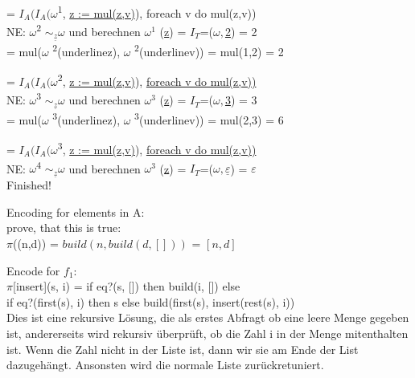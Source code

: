 \documentclass[10pt, a4paper]{article}
\newcommand{\letpi}{$\pi$}
\newcommand{\InterA}{$I_{\mathcal{A}}$}
\newcommand{\InterP}{$I_{\mathcal{P}}$}
\newcommand{\InterT}{$I_{\mathcal{T}}$}
\newcommand{\unl}[1]{\underline{#1}}
\begin{document}
    
    = $I_A(I_A(\omega$\textsuperscript{1}, \underline{z := mul(z,v)}), foreach v do mul(z,v)) \\
    
    
    NE: $\omega$\textsuperscript{2} $\sim_{\unl{z}} \omega$ und berechnen $\omega^1$ (\underline{z}) = $I_T$=($\omega, $\underline{2}) = 2 \\
    = mul($\omega$ \textsuperscript{2}(underline{z}), $\omega$ \textsuperscript{2}(underline{v})) = mul(1,2) = 2
    
    = $I_A(I_A(\omega$\textsuperscript{2}, \underline{z := mul(z,v)}), \underline{foreach v do mul(z,v))} \\
    
     NE: $\omega$\textsuperscript{3} $\sim_{\unl{z}} \omega$ und berechnen $\omega^3$ (\underline{z}) = $I_T$=($\omega, $\underline{3}) = 3 \\
    = mul($\omega$ \textsuperscript{3}(underline{z}), $\omega$ \textsuperscript{3}(underline{v})) = mul(2,3) = 6
    
    = $I_A(I_A(\omega$\textsuperscript{3}, \underline{z := mul(z,v)}), \underline{foreach v do mul(z,v))} \\
    
    NE: $\omega$\textsuperscript{4} $\sim_{\unl{z}} \omega$ und berechnen $\omega^3$ (\underline{z}) = $I_T$=($\omega, \underline{\varepsilon}$) = $\varepsilon$ \\
    
Finished!
    






Encoding for elements in A: \\
prove, that this is true: \\
\letpi((n,d)) = $build(n,build(d,[]))$ = $[n,d]$



Encode for $f_{1}$:\vspace{0pt}\\
\letpi[insert](s, i) = if eq?(s, []) then build(i, []) else\vspace{2pt}\\
if eq?(first(s), i) then s else build(first(s), insert(rest(s), i))\vspace{2pt}\\
Dies ist eine rekursive Lösung, die als erstes Abfragt ob eine leere Menge gegeben ist, andererseits wird rekursiv überprüft, ob die Zahl i in der Menge mitenthalten ist. Wenn die Zahl nicht in der Liste ist, dann wir sie am Ende der List dazugehängt. Ansonsten wird die normale Liste zurückretuniert. \\
\end{document}
